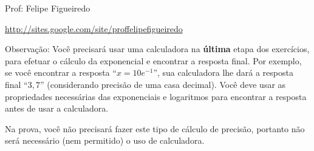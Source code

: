 \documentclass[a4paper]{article}
\begin{document}
\parbox[c]{.825\textwidth}{\raggedright%
{Prof: Felipe Figueiredo\par}
{\url{http://sites.google.com/site/proffelipefigueiredo}}

\vspace{1cm}
}


Observação: Você precisará usar uma calculadora na {\bf última} etapa
dos exercícios, para efetuar o cálculo da exponencial e encontrar a
resposta final. Por exemplo, se você encontrar a resposta
``$x=10e^{-1}$'', sua calculadora lhe dará a resposta final ``$3,7$''
(considerando precisão de uma casa decimal). Você deve usar as
propriedades necessárias das exponenciais e logaritmos para encontrar
a resposta antes de usar a calculadora.

Na prova, você não precisará fazer este tipo de cálculo de precisão,
portanto não será necessário (nem permitido) o uso de calculadora.
\end{document}
